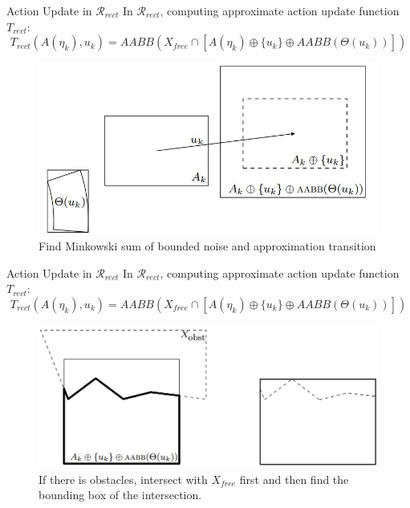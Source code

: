\documentclass[10pt]{beamer}
\begin{document}
\begin{frame}{Action Update in $\mathcal{R}_{rect}$}
  In $\mathcal{R}_{rect}$, computing approximate action update function $T_{rect} :$\\
  $$T_{rect}(A(\eta_k), u_k) = AABB(X_{free} \cap [A(\eta_k) \oplus \{ u_k \} \oplus AABB(\Theta(u_k))])$$
  \begin{figure}
    \includegraphics[scale=0.35]{figs/step12.jpg}
    \caption{Find Minkowski sum of bounded noise and approximation transition}
  \end{figure}
\end{frame}


\begin{frame}{Action Update in $\mathcal{R}_{rect}$}
  In $\mathcal{R}_{rect}$, computing approximate action update function $T_{rect} :$\\
  $$T_{rect}(A(\eta_k), u_k) = AABB(X_{free} \cap [A(\eta_k) \oplus \{ u_k \} \oplus AABB(\Theta(u_k))])$$
  \begin{figure}
    \includegraphics[scale=0.35]{figs/step34.jpg}
    \caption{If there is obstacles, intersect with $X_{free}$ first and
      then find the bounding box of the intersection.}
  \end{figure} 
\end{frame}
\end{document}
